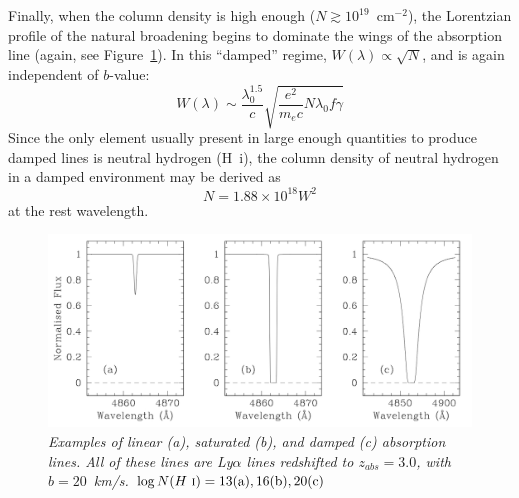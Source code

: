 Finally, when the column density is high enough ($N \gtrsim 10^{19}$~cm$^{-2}$), the Lorentzian profile of the natural broadening begins to dominate the wings of the absorption line (again, see Figure~\ref{fig:linetypes}). In this ``damped'' regime, $W(\lambda) \propto \sqrt{N}$, and is again independent of $b$-value:
\begin{equation}
	W(\lambda) \sim \frac{\lambda_0^{1.5}}{c}\sqrt{\frac{e^2}{m_ec}N\lambda_0f\gamma}
\end{equation}
Since the only element usually present in large enough quantities to produce damped lines is neutral hydrogen (H~{\sc i}), the column density of neutral hydrogen in a damped environment may be derived as
\begin{equation}
	N = 1.88 \times 10^{18} W^2
\end{equation}
at the rest wavelength.

\begin{center}
\begin{figure}[htbp]
\begin{center}
\includegraphics[scale=0.35, angle=0.0]{fig_linetypes.jpg}
\caption{\textsl{Examples of linear (a), saturated (b), and damped (c) absorption lines. All of these lines are Ly$\alpha$ lines redshifted to $z_{abs}=3.0$, with $b = 20$~km/s. $\log N(H~\text{{\sc i}}) = 13 ({\rm a}), 16 ({\rm b}), 20 ({\rm c})$}}\label{fig:linetypes}
\end{center}
\end{figure}
\end{center}

